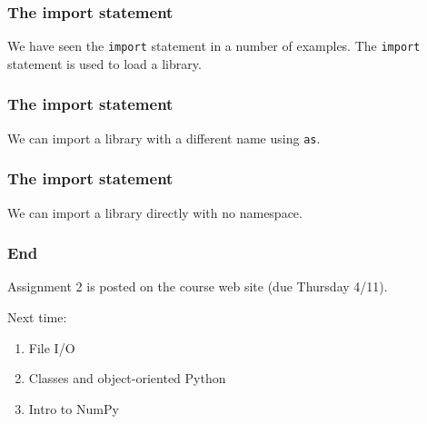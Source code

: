 \documentclass{beamer}
\begin{document}
\begin{frame}
\frametitle{The import statement}

We have seen the \texttt{import} statement in a number of examples.  The \texttt{import} statement is used to load a library.

\end{frame}

\begin{frame}
\frametitle{The import statement}

We can import a library with a different name using \texttt{as}.

\end{frame}

\begin{frame}
\frametitle{The import statement}

We can import a library directly with no namespace.

\end{frame}


\begin{frame}
\frametitle{End}
Assignment 2 is posted on the course web site (due Thursday 4/11).

\vspace{0.2in}

Next time:
\begin{enumerate}
\setlength{\itemsep}{0.05in}
\item{File I/O}
\item{Classes and object-oriented Python}
\item{Intro to NumPy}
\end{enumerate}

\end{frame}
\end{document}
